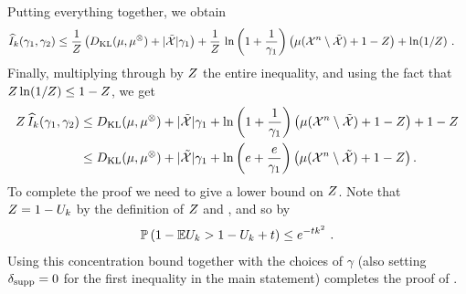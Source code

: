 %
%
Putting everything together, we obtain
\begin{align*}
  \widehat I_k(\gamma_1, \gamma_2)
  &\leq
  \frac{1}{Z}\left(D_{\mathrm{KL}}(\mu, \mu^{\otimes}) + |\tilde {{\mathcal{X}}}|\gamma_1\right)
  +
  \frac{1}{Z} \, \ln \left(  1 + \frac{1}{\gamma_1} \right) \left(  \mu({\mathcal{X}}^n \setminus \tilde{{\mathcal{X}}}) + 1-Z  \right)
  +
  \ln(1/Z)~.
\end{align*}
%
Finally, multiplying through by $Z$ the entire inequality, and using the fact that $Z \ln(1/Z) \leq 1-Z$, we get
\begin{align*}
  Z \, \widehat I_k(\gamma_1, \gamma_2)
  &\leq
  D_{\mathrm{KL}}(\mu, \mu^{\otimes}) + |\tilde {{\mathcal{X}}}|\gamma_1
  +
  \ln \left(  1 + \frac{1}{\gamma_1} \right) \left(  \mu({\mathcal{X}}^n \setminus \tilde{{\mathcal{X}}}) + 1-Z  \right)
  +
    1 - Z\\
  &\leq
    D_{\mathrm{KL}}(\mu, \mu^{\otimes}) + |\tilde {{\mathcal{X}}}|\gamma_1
  +
  \ln \left(  e + \frac{e}{\gamma_1} \right) \left(  \mu({\mathcal{X}}^n \setminus \tilde{{\mathcal{X}}}) + 1-Z  \right).
\end{align*}
%
%
%
To complete the proof we need to give a lower bound on $Z$.
Note that $Z = 1 - U_k$ by the definition of $Z$ and , and so by 
\begin{align*}
  \mathbb{P}\left( 1 - \mathbb{E} U_k > 1 - U_k + t \right) \leq e^{-t k ^2}~.
\end{align*}
Using this concentration bound together with the choices of $\gamma$ (also setting $\delta_{\mathrm{supp}}=0$ for the first inequality in the main statement) completes the proof of .
\QED

